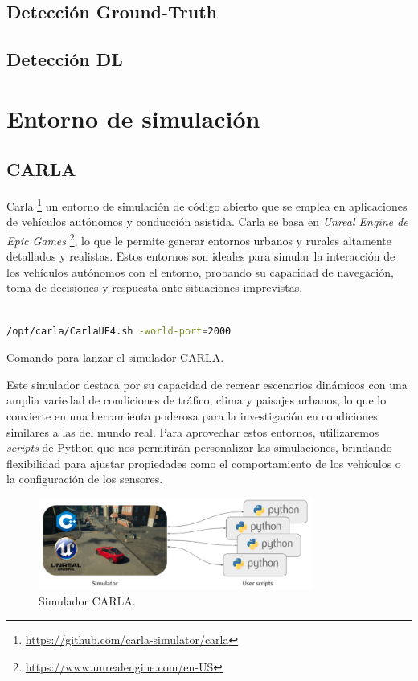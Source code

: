 \subsection{Detección Ground-Truth}
\label{sec:gt}
\subsection{Detección \ac{DL}}
\label{sec:gt}

\section{Entorno de simulación}
\label{sec:sim}
\subsection{CARLA}
\label{sec:carla}

Carla \footnote{\url{https://github.com/carla-simulator/carla}} un entorno de simulación de código abierto que se emplea en aplicaciones de vehículos autónomos y conducción asistida. Carla se basa en \textit{Unreal Engine de Epic Games} \footnote{\url{https://www.unrealengine.com/en-US}}, lo que le permite generar entornos urbanos y rurales altamente detallados y realistas. Estos entornos son ideales para simular la interacción de los vehículos autónomos con el entorno, probando su capacidad de navegación, toma de decisiones y respuesta ante situaciones imprevistas.

\begin{code}[h]
\begin{lstlisting}[language=bash]

/opt/carla/CarlaUE4.sh -world-port=2000

\end{lstlisting}
\caption[Comando para lanzar el simulador CARLA]{Comando para lanzar el simulador CARLA.}
\label{cod:cmdcarla}
\end{code}

Este simulador destaca por su capacidad de recrear escenarios dinámicos con una amplia variedad de condiciones de tráfico, clima y paisajes urbanos, lo que lo convierte en una herramienta poderosa para la investigación en condiciones similares a las del mundo real. Para aprovechar estos entornos, utilizaremos \textit{scripts} de Python que nos permitirán personalizar las simulaciones, brindando flexibilidad para ajustar propiedades como el comportamiento de los vehículos o la configuración de los sensores.

\begin{figure}[ht]
  \begin{center}
    \includegraphics[width=9cm]{figs/Plataformas_Desarollo/carla.png}
  \end{center}
  \caption{Simulador CARLA.}
  \label{carla}
\end{figure}

